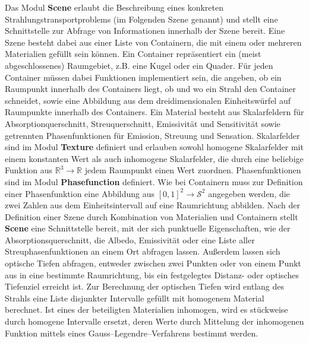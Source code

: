 	Das Modul \textbf{Scene} erlaubt die Beschreibung eines konkreten Strahlungstransportproblems (im Folgenden Szene genannt) und stellt eine Schnittstelle zur Abfrage von Informationen innerhalb der Szene bereit. Eine Szene besteht dabei aus einer Liste von Containern, die mit einem oder mehreren Materialien gefüllt sein können. Ein Container repräsentiert ein (meist abgeschlossenes) Raumgebiet, z.B. eine Kugel oder ein Quader. Für jeden Container müssen dabei Funktionen implementiert sein, die angeben, ob ein Raumpunkt innerhalb des Containers liegt, ob und wo ein Strahl den Container schneidet, sowie eine Abbildung aus dem dreidimensionalen Einheitswürfel auf Raumpunkte innerhalb des Containers. Ein Material besteht aus Skalarfeldern für Absorptionquerschnitt, Streuquerschnitt, Emissivität und Sensitivität sowie getrennten Phasenfunktionen für Emission, Streuung und Sensation. Skalarfelder sind im Modul \textbf{Texture} definiert und erlauben sowohl homogene Skalarfelder mit einem konstanten Wert als auch inhomogene Skalarfelder, die durch eine beliebige Funktion aus $\mathbb{R}^3\to\mathbb{R}$ jedem Raumpunkt einen Wert zuordnen. Phasenfunktionen sind im Modul \textbf{Phasefunction} definiert. Wie bei Containern muss zur Definition einer Phasenfunktion eine Abbildung aus $[0,1]^2\to\mathcal{S}^2$ angegeben werden, die zwei Zahlen aus dem Einheitsintervall auf eine Raumrichtung abbilden. Nach der Definition einer Szene durch Kombination von Materialien und Containern stellt \textbf{Scene} eine Schnittstelle bereit, mit der sich punktuelle Eigenschaften, wie der Absorptionsquerschnitt, die Albedo, Emissivität oder eine Liste aller Streuphasenfunktionen an einem Ort abfragen lassen. Außerdem lassen sich optische Tiefen abfragen, entweder zwischen zwei Punkten oder von einem Punkt aus in eine bestimmte Raumrichtung, bis ein festgelegtes Distanz- oder optisches Tiefenziel erreicht ist. Zur Berechnung der optischen Tiefen wird entlang des Strahls eine Liste disjunkter Intervalle gefüllt mit homogenem Material berechnet. Ist eines der beteiligten Materialien inhomogen, wird es stückweise durch homogene Intervalle ersetzt, deren Werte durch Mittelung der inhomogenen Funktion mittels eines Gauss--Legendre--Verfahrens bestimmt werden.
	
